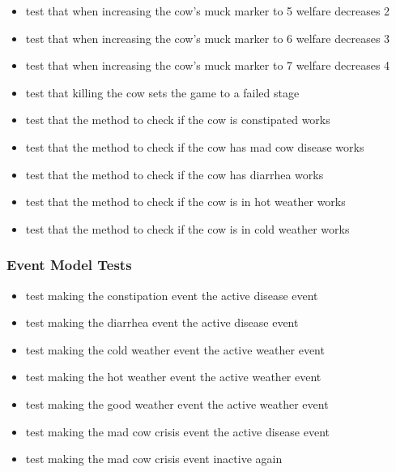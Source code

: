 \begin{itemize}
	\item test that when increasing the cow's muck marker to 5 welfare decreases 2
	\item test that when increasing the cow's muck marker to 6 welfare decreases 3
	\item test that when increasing the cow's muck marker to 7 welfare decreases 4
	\item test that killing the cow sets the game to a failed stage
	\item test that the method to check if the cow is constipated works
	\item test that the method to check if the cow has mad cow disease works
	\item test that the method to check if the cow has diarrhea works
	\item test that the method to check if the cow is in hot weather works
	\item test that the method to check if the cow is in cold weather works
\end{itemize}

\subsubsection{Event Model Tests}
\begin{itemize}
	\item test making the constipation event the active disease event
	\item test making the diarrhea event the active disease event
	\item test making the cold weather event the active weather event
	\item test making the hot weather event the active weather event
	\item test making the good weather event the active weather event
	\item test making the mad cow crisis event the active disease event
	\item test making the mad cow crisis event inactive again
\end{itemize}

